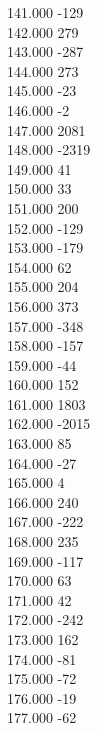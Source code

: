 { 141.000	-129 \\
 142.000	279 \\
 143.000	-287 \\
 144.000	273 \\
 145.000	-23 \\
 146.000	-2 \\
 147.000	2081 \\
 148.000	-2319 \\
 149.000	41 \\
 150.000	33 \\
 151.000	200 \\
 152.000	-129 \\
 153.000	-179 \\
 154.000	62 \\
 155.000	204 \\
 156.000	373 \\
 157.000	-348 \\
 158.000	-157 \\
 159.000	-44 \\
 160.000	152 \\
 161.000	1803 \\
 162.000	-2015 \\
 163.000	85 \\
 164.000	-27 \\
 165.000	4 \\
 166.000	240 \\
 167.000	-222 \\
 168.000	235 \\
 169.000	-117 \\
 170.000	63 \\
 171.000	42 \\
 172.000	-242 \\
 173.000	162 \\
 174.000	-81 \\
 175.000	-72 \\
 176.000	-19 \\
 177.000	-62 \\
}
